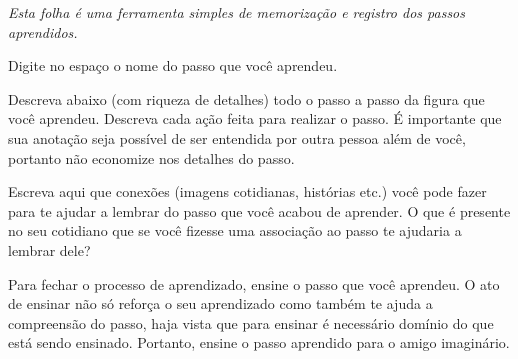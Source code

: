 \newpage
\thispagestyle{plain}
\begin{center}\end{center}
\label{pos:page:folhamemorizacao}

\begin{center}\Large\textit{ Esta folha é uma ferramenta simples de memorização e registro dos passos aprendidos.}\end{center}

\noindent Digite no espaço o nome do passo que você aprendeu.

\BOXDATA\;

\noindent Descreva abaixo (com riqueza de detalhes) todo o passo a passo da
figura que você aprendeu. Descreva cada ação feita para realizar o passo.
É importante que sua anotação seja possível de ser entendida por outra 
pessoa além de você, portanto não economize nos detalhes do passo.

\LINEDATA\;
\LINEDATA\;
\LINEDATA\;
\LINEDATA\;
\LINEDATA

\noindent Escreva aqui que conexões (imagens cotidianas, histórias etc.)
você pode fazer para te ajudar a lembrar do passo que você acabou de aprender.
O que é presente no seu cotidiano que se você fizesse uma associação ao passo
te ajudaria a lembrar dele?

\LINEDATA\;
\LINEDATA\;
\LINEDATA

\noindent Para fechar o processo de aprendizado, ensine o passo que você aprendeu.
O ato de ensinar não só reforça o seu aprendizado como também te ajuda a
compreensão do passo, haja vista que para ensinar é necessário domínio do
que está sendo ensinado. Portanto, ensine o passo aprendido para o amigo 
imaginário.\\

\FOOTPAGE\;
